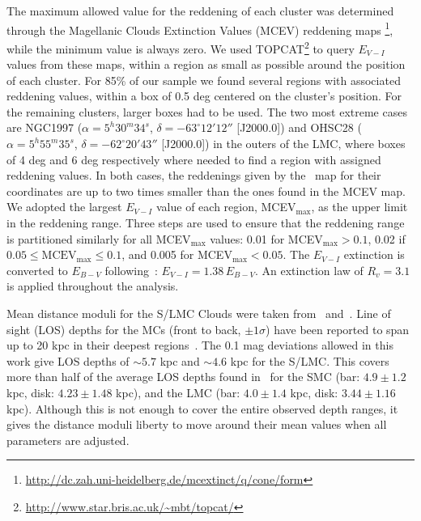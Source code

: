\documentclass[draft]{aa}
\begin{document}
The maximum allowed value for the reddening of each cluster was determined
through the Magellanic Clouds Extinction Values (MCEV) reddening maps
\citep{Haschke_2011}\footnote{\url{
http://dc.zah.uni-heidelberg.de/mcextinct/q/cone/form}}, while
the minimum value is always zero.
%
We used TOPCAT\footnote{\url{http://www.star.bris.ac.uk/~mbt/topcat/}}
to query $E_{V-I}$ values from these maps, within a region as small as possible
around the position of each cluster.
For 85\% of our sample we found several regions with associated reddening
values, within a box of 0.5 deg centered on the cluster's position.
For the remaining clusters, larger boxes had to be used. The two most extreme
cases are NGC1997
($\alpha{=}5^h30^m34^s$, $\delta{=}-63^\circ12'12''$ [J2000.0]) and OHSC28
($\alpha{=}5^h55^m35^s$, $\delta{=}-62^\circ20'43''$ [J2000.0]) in the outers
of the LMC, where boxes of 4 deg and 6 deg respectively where needed to find a
region with assigned reddening values. In both cases, the reddenings given by
the~\cite{Schlafly_2011} map for their coordinates are up to two times smaller
than the ones found in the MCEV map.
%
We adopted the largest $E_{V-I}$ value of each region, MCEV$_{\max}$, as the
upper limit in the reddening range. Three steps are used to ensure that the
reddening range is partitioned similarly for all MCEV$_{\max}$ values: 0.01 for
MCEV$_{\max} {>}0.1$, 0.02 if $0.05{\leq}\mathrm{MCEV}_{\max}{\leq}0.1$, and
0.005 for MCEV$_{\max}{<}0.05$.
%
The $E_{V-I}$ extinction is converted to $E_{B-V}$
following~\cite{Tammann_2003}: $E_{V-I}{=}1.38\,E_{B-V}$. An extinction
law of $R_v{=}3.1$ is applied throughout the analysis.

Mean distance moduli for the S/LMC Clouds were taken
from~\cite{de_Grijs_2015} and~\cite{de_Grijs_2014}.
%
Line of sight (LOS) depths for the MCs (front to back, $\pm1\sigma$) have been
reported to span up to 20 kpc in their deepest
regions~\citep{Subramanian_2009,Nidever_2013,Scowcroft_2015}.
%
The 0.1 mag deviations allowed in this work give LOS depths of ${\sim}5.7$ kpc
and ${\sim}4.6$ kpc for the S/LMC\@. This covers more than half of the average
LOS depths found in~\cite{Subramanian_2009} for the SMC (bar: $4.9\pm1.2$ kpc,
disk: $4.23\pm1.48$ kpc), and the LMC (bar: $4.0\pm1.4$ kpc, disk: $3.44\pm1.16$
kpc).
Although this is not enough to cover the entire observed depth ranges, it gives
the distance moduli liberty to move around their mean values when all parameters
are adjusted.
\end{document}
